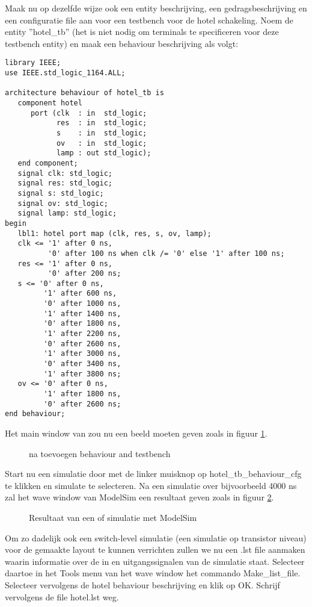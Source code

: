 Maak nu op dezelfde wijze ook een entity beschrijving, 
een gedragsbeschrijving en een configuratie file aan
voor een testbench voor de hotel schakeling.
Noem de entity ''hotel\_tb'' (het is niet nodig om terminals te specificeren
voor deze testbench entity) en maak een behaviour beschrijving als volgt:
\begin{verbatim}
library IEEE;
use IEEE.std_logic_1164.ALL;

architecture behaviour of hotel_tb is
   component hotel
      port (clk  : in  std_logic;
            res  : in  std_logic;
            s    : in  std_logic;
            ov   : in  std_logic;
            lamp : out std_logic);
   end component;
   signal clk: std_logic;
   signal res: std_logic;
   signal s: std_logic;
   signal ov: std_logic;
   signal lamp: std_logic;
begin
   lbl1: hotel port map (clk, res, s, ov, lamp);
   clk <= '1' after 0 ns,
          '0' after 100 ns when clk /= '0' else '1' after 100 ns;
   res <= '1' after 0 ns,
          '0' after 200 ns;
   s <= '0' after 0 ns,
         '1' after 600 ns,
         '0' after 1000 ns,
         '1' after 1400 ns,
         '0' after 1800 ns,
         '1' after 2200 ns,
         '0' after 2600 ns,
         '1' after 3000 ns,
         '0' after 3400 ns,
         '1' after 3800 ns;
   ov <= '0' after 0 ns,
         '1' after 1800 ns,
         '0' after 2600 ns;
end behaviour;
\end{verbatim}
Het main window van  zou nu een beeld moeten geven
zoals in figuur \ref{df1}.
\begin{figure}[h]
\centerline{}
\caption{ na toevoegen behaviour and testbench}
\label{df1}
\end{figure}

Start nu een  simulatie door met de linker muisknop
op hotel\_tb\_behaviour\_cfg te klikken
en simulate te selecteren.
Na een simulatie over bijvoorbeeld 4000 ns zal het wave window van ModelSim
een resultaat geven zoals in figuur \ref{sim1}.
\begin{figure}[h]
\centerline{}
\caption{Resultaat van een of  simulatie met ModelSim}
\label{sim1}
\end{figure}
Om zo dadelijk ook een switch-level simulatie (een simulatie op
transistor niveau) voor de gemaakte layout te kunnen verrichten 
zullen we nu een .lst file aanmaken
waarin informatie over de in en uitgangssignalen van de simulatie staat.
Selecteer daartoe in het Tools menu van het wave window het commando Make\_list\_file.
Selecteer vervolgens de hotel behaviour beschrijving en klik op OK.
Schrijf vervolgens de file hotel.lst weg.

